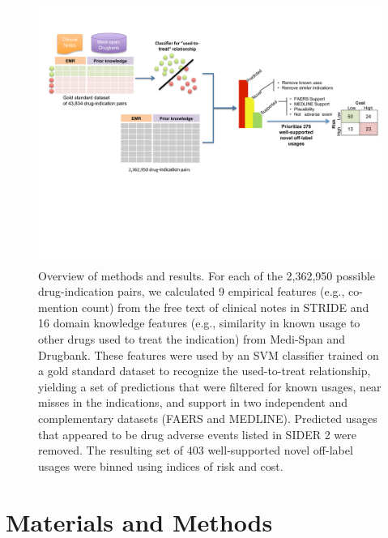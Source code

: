 \begin{figure}
  \begin{center}
    \includegraphics[width=0.9\linewidth]{ch2-figures/Figure1.pdf}
  \end{center}
  \caption[Overview of learning off-label usages]{Overview of methods
    and results.  For each of the 2,362,950 possible drug-indication
    pairs, we calculated 9 empirical features (e.g., co-mention count)
    from the free text of clinical notes in STRIDE and 16 domain
    knowledge features (e.g., similarity in known usage to other drugs
    used to treat the indication) from Medi-Span and Drugbank.  These
    features were used by an SVM classifier trained on a gold standard
    dataset to recognize the used-to-treat relationship, yielding a
    set of predictions that were filtered for known usages, near
    misses in the indications, and support in two independent and
    complementary datasets (FAERS and MEDLINE).  Predicted usages that
    appeared to be drug adverse events listed in SIDER 2 were removed.
    The resulting set of 403 well-supported novel off-label usages
    were binned using indices of risk and cost.  }
  \label{fig:short}
\end{figure}


\section{Materials and Methods}
